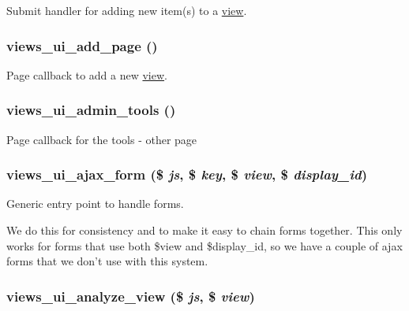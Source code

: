 Submit handler for adding new item(s) to a \hyperlink{classview}{view}. \hypertarget{admin_8inc_f5b029abb01c601d29c40a83733a725d}{
\subsubsection[{views\_\-ui\_\-add\_\-page}]{\setlength{\rightskip}{0pt plus 5cm}views\_\-ui\_\-add\_\-page ()}}
\label{admin_8inc_f5b029abb01c601d29c40a83733a725d}


Page callback to add a new \hyperlink{classview}{view}. \hypertarget{admin_8inc_8d86dbe400c0ad869694a85f767be3d6}{
\subsubsection[{views\_\-ui\_\-admin\_\-tools}]{\setlength{\rightskip}{0pt plus 5cm}views\_\-ui\_\-admin\_\-tools ()}}
\label{admin_8inc_8d86dbe400c0ad869694a85f767be3d6}


Page callback for the tools - other page \hypertarget{admin_8inc_ff8d306f0dd773c65acb1f93bdf64b00}{
\subsubsection[{views\_\-ui\_\-ajax\_\-form}]{\setlength{\rightskip}{0pt plus 5cm}views\_\-ui\_\-ajax\_\-form (\$ {\em js}, \/  \$ {\em key}, \/  \$ {\em view}, \/  \$ {\em display\_\-id})}}
\label{admin_8inc_ff8d306f0dd773c65acb1f93bdf64b00}


Generic entry point to handle forms.

We do this for consistency and to make it easy to chain forms together. This only works for forms that use both \$view and \$display\_\-id, so we have a couple of ajax forms that we don't use with this system. \hypertarget{admin_8inc_eb3f9989feda5d808cba123a41047634}{
\subsubsection[{views\_\-ui\_\-analyze\_\-view}]{\setlength{\rightskip}{0pt plus 5cm}views\_\-ui\_\-analyze\_\-view (\$ {\em js}, \/  \$ {\em view})}}
\label{admin_8inc_eb3f9989feda5d808cba123a41047634}


